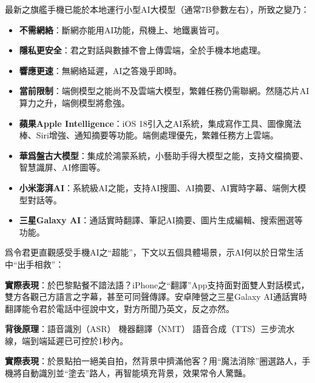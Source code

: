 
最新之旗艦手機已能於本地運行小型AI大模型（通常7B參數左右），所致之變乃：

\begin{itemize}
  \item \textbf{不需網絡}：斷網亦能用AI功能，飛機上、地鐵裏皆可。
  \item \textbf{隱私更安全}：君之對話與數據不會上傳雲端，全於手機本地處理。
  \item \textbf{響應更速}：無網絡延遲，AI之答幾乎即時。
  \item \textbf{當前限制}：端側模型之能尚不及雲端大模型，繁雜任務仍需聯網。然隨芯片AI算力之升，端側模型將愈強。
\end{itemize}


\begin{itemize}
  \item \textbf{蘋果Apple Intelligence}：iOS 18引入之AI系統，集成寫作工具、圖像魔法棒、Siri增強、通知摘要等功能。端側處理優先，繁雜任務方上雲端。
  \item \textbf{華爲盤古大模型}：集成於鴻蒙系統，小藝助手得大模型之能，支持文檔摘要、智慧識屏、AI修圖等。
  \item \textbf{小米澎湃AI}：系統級AI之能，支持AI搜圖、AI摘要、AI實時字幕、端側大模型對話等。
  \item \textbf{三星Galaxy AI}：通話實時翻譯、筆記AI摘要、圖片生成編輯、搜索圈選等功能。
\end{itemize}


爲令君更直觀感受手機AI之“超能”，下文以五個具體場景，示AI何以於日常生活中“出手相救”：


\textbf{實際表現}：於巴黎點餐不諳法語？iPhone之“翻譯”App支持面對面雙人對話模式，雙方各觀己方語言之字幕，甚至可同聲傳譯。安卓陣營之三星Galaxy AI通話實時翻譯能令君於電話中徑說中文，對方所聞乃英文，反之亦然。

\textbf{背後原理}：語音識別（ASR） 機器翻譯（NMT） 語音合成（TTS）三步流水線，端到端延遲已可控於1秒內。


\textbf{實際表現}：於景點拍一絕美自拍，然背景中擠滿他客？用“魔法消除”圈選路人，手機將自動識別並“塗去”路人，再智能填充背景，效果常令人驚豔。

